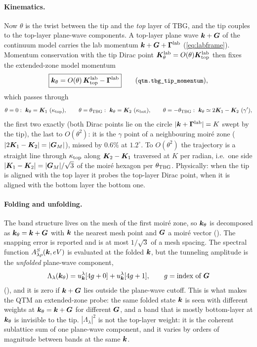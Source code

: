 \paragraph{Kinematics.} Now $\theta$ is the twist between the tip and the \emph{top} layer of TBG, and the tip couples
to the top-layer plane-wave components. A top-layer plane wave $\bm k+\bm G$ of the continuum model carries the lab momentum
$\bm k+\bm G+\bm\Gamma^{\rm lab}$ (\cref{eq:labframe}). Momentum conservation with the tip Dirac point
$\bm K^{\rm lab}_\theta=O(\theta)\bm K^{\rm lab}_{\rm top}$ then fixes the extended-zone model momentum
\begin{equation}
\boxed{\bk_\theta=O(\theta)\,\bK^{\rm lab}_{\rm top}-\bm\Gamma^{\rm lab}}\qquad(\code{qtm.tbg\_tip\_momentum}),
\label{eq:ktheta}
\end{equation}
which passes through
\begin{equation}
\theta=0:\ \bk_\theta=\bK_1\ (\kappa_{\rm top}),\qquad
\theta=\theta_{\rm TBG}:\ \bk_\theta=\bK_2\ (\kappa_{\rm bot}),\qquad
\theta=-\theta_{\rm TBG}:\ \bk_\theta\simeq2\bK_1-\bK_2\ (\gamma'),
\end{equation}
the first two exactly (both Dirac points lie on the circle $|\bm k+\bm\Gamma^{\rm lab}|=K$ swept by the tip), the last to
$O(\theta^2)$: it is the $\gamma$ point of a neighbouring moir\'e zone ($|2\bm K_1-\bm K_2|=|\bm G_M|$), missed by $0.6\%$ at
$1.2^\circ$. To $O(\theta^2)$ the trajectory is a straight line through $\kappa_{\rm top}$ along $\bm K_2-\bm K_1$ traversed at $K$ per radian, i.e.\ one
side $|\bm K_1-\bm K_2|=|\bm G_M|/\sqrt3$ of the moir\'e hexagon per $\theta_{\rm TBG}$. Physically: when the tip is
aligned with the top layer it probes the top-layer Dirac point, when it is aligned with the bottom layer the
bottom one.

\paragraph{Folding and unfolding.} The band structure lives on the mesh of the first moir\'e zone, so
$\bm k_\theta$ is decomposed as $\bm k_\theta=\bm k+\bm G$ with $\bm k$ the nearest mesh point and $\bm G$ a moir\'e vector
(). The snapping error is reported and is at most $1/\sqrt3$ of a mesh spacing.
The spectral function $A^S_{\lambda\rho}(\bm k,eV)$ is evaluated at the folded $\bm k$, but the tunneling amplitude
is the \emph{unfolded} plane-wave component,
\begin{equation}
\Lambda_\lambda(\bm k_\theta)=u^\lambda_{\bm k}[4g+0]+u^\lambda_{\bm k}[4g+1],\qquad g=\text{index of }\bm G
\label{eq:Lambdatbg}
\end{equation}
(), and it is zero if $\bm k+\bm G$ lies outside the plane-wave cutoff. This is what makes the
QTM an extended-zone probe: the same folded state $\bm k$ is seen with different weights at $\bm k_\theta=\bm k+\bm G$ for
different $\bm G$, and a band that is mostly bottom-layer at $\bm k_\theta$ is invisible to the tip. $|\Lambda_\lambda|^2$
is not the top-layer weight: it is the coherent sublattice sum of one plane-wave component, and it varies by
orders of magnitude between bands at the same $\bm k$.

